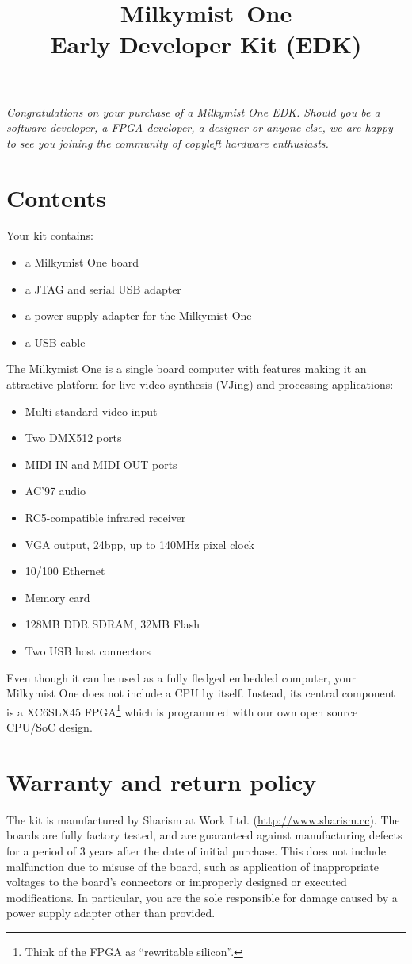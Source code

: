 \documentclass{leaflet}
\title{Milkymist\texttrademark~One\\Early Developer Kit (EDK)}
\date{}
\begin{document}
\maketitle
\textit{Congratulations on your purchase of a Milkymist One EDK. Should you be a software developer, a FPGA developer, a designer or anyone else, we are happy to see you joining the community of copyleft hardware enthusiasts.}

\section{Contents}
Your kit contains:
\begin{itemize}
\item a Milkymist One board
\item a JTAG and serial USB adapter
\item a power supply adapter for the Milkymist One
\item a USB cable
\end{itemize}

The Milkymist One is a single board computer with features making it an attractive platform for live video synthesis (VJing) and processing applications:
\begin{itemize}
\item Multi-standard video input
\item Two DMX512 ports
\item MIDI IN and MIDI OUT ports
\item AC'97 audio
\item RC5-compatible infrared receiver
\item VGA output, 24bpp, up to 140MHz pixel clock
\item 10/100 Ethernet
\item Memory card
\item 128MB DDR SDRAM, 32MB Flash
\item Two USB host connectors
\end{itemize}

Even though it can be used as a fully fledged embedded computer, your Milkymist One does not include a CPU by itself. Instead, its central component is a XC6SLX45 FPGA\footnote{Think of the FPGA as ``rewritable silicon''.} which is programmed with our own open source CPU/SoC design.

\section{Warranty and return policy}
The kit is manufactured by Sharism at Work Ltd. (\url{http://www.sharism.cc}). The boards are fully factory tested, and are guaranteed against manufacturing defects for a period of 3 years after the date of initial purchase. This does not include malfunction due to misuse of the board, such as application of inappropriate voltages to the board's connectors or improperly designed or executed modifications. In particular, you are the sole responsible for damage caused by a power supply adapter other than provided.
\end{document}
